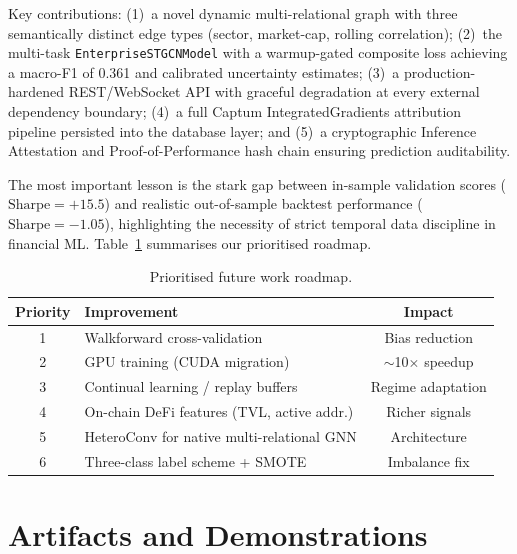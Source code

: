 \documentclass{article}
\begin{document}
Key contributions: (1)~a novel dynamic multi-relational graph with three semantically distinct edge types (sector, market-cap, rolling correlation); (2)~the multi-task \texttt{EnterpriseSTGCNModel} with a warmup-gated composite loss achieving a macro-F1 of 0.361 and calibrated uncertainty estimates; (3)~a production-hardened REST/WebSocket API with graceful degradation at every external dependency boundary; (4)~a full Captum IntegratedGradients attribution pipeline persisted into the database layer; and (5)~a cryptographic Inference Attestation and Proof-of-Performance hash chain ensuring prediction auditability.

The most important lesson is the stark gap between in-sample validation scores ($\mathrm{Sharpe}=+15.5$) and realistic out-of-sample backtest performance ($\mathrm{Sharpe}=-1.05$), highlighting the necessity of strict temporal data discipline in financial ML. Table~\ref{tab:future} summarises our prioritised roadmap.

\begin{table}[h]
  \centering
  \caption{Prioritised future work roadmap.}
  \vspace{3pt}
  \label{tab:future}
  \setlength{\tabcolsep}{4pt}
  \begin{tabular}{clc}
    \toprule
    Priority & Improvement & Impact \\
    \midrule
    1 & Walkforward cross-validation & Bias reduction \\
    2 & GPU training (CUDA migration) & $\sim$10$\times$ speedup \\
    3 & Continual learning / replay buffers & Regime adaptation \\
    4 & On-chain DeFi features (TVL, active addr.) & Richer signals \\
    5 & HeteroConv for native multi-relational GNN & Architecture \\
    6 & Three-class label scheme + SMOTE & Imbalance fix \\
    \bottomrule
  \end{tabular}
\end{table}

\section{Artifacts and Demonstrations}
\end{document}
